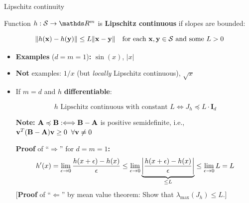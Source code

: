 \documentclass[11pt,compress,t,notes=noshow, xcolor=table]{beamer}
\begin{document}
\begin{vbframe}{Lipschitz continuity}

\vspace{-\baselineskip}

\begin{kframe}
    Function $h : \mathcal{S} \to \R^m$ is \textbf{Lipschitz continuous} if slopes are bounded:

    \vspace{-1.25\baselineskip}
    
    \begin{equation*}
        \|h(\mathbf{x}) - h(\mathbf{y})\| \leq L \|\mathbf{x} - \mathbf{y}\| \quad \text{for each $\mathbf{x},\mathbf{y}\in\mathcal{S}$ and some~$L>0$}
    \end{equation*}
\end{kframe}

\begin{itemize}
    \item \textbf{Examples} ($d=m=1$)\textbf{:} $\sin(x)$, $|x|$
    \item \textbf{Not} examples: $1/x$ (but \textit{locally} Lipschitz continuous), $\sqrt{x}$
    \item If $m=d$ and $h$ \textbf{differentiable}:
        
        \vspace{-0.5\baselineskip}
        
        \begin{kframe}
            \vspace{-0.3\baselineskip}
            \begin{equation*}
                \text{$h$ Lipschitz continuous with constant $L$} \Longleftrightarrow J_h \preccurlyeq L \cdot \mathbf{I}_d
            \end{equation*}
        \end{kframe}
        
        \begin{footnotesize}
            \textbf{Note:} $\mathbf{A} \preccurlyeq \mathbf{B} :\Longleftrightarrow \mathbf{B} - \mathbf{A}$ is positive semidefinite, i.e., $\mathbf{v}^T(\mathbf{B} - \mathbf{A})\mathbf{v} \geq 0 \;\; \forall \mathbf{v} \neq 0$

            \medskip
            
            \textbf{Proof} of \enquote{$\Rightarrow$} for $d=m=1$\textbf{:}
            \begin{equation*}
                h'(x) = \lim_{\epsilon\to0} \frac{h(x+\epsilon)-h(x)}{\epsilon} \leq \lim_{\epsilon\to0}\underbrace{\left|\frac{h(x+\epsilon)-h(x)}{\epsilon}\right|}_{\leq L} \leq \lim_{\epsilon\to0}L = L
            \end{equation*}
            [\textbf{Proof} of \enquote{$\Leftarrow$} by mean value theorem: Show that $\lambda_\text{max}(J_h) \leq L$.]
        \end{footnotesize}
\end{itemize}

\end{vbframe}
\end{document}
